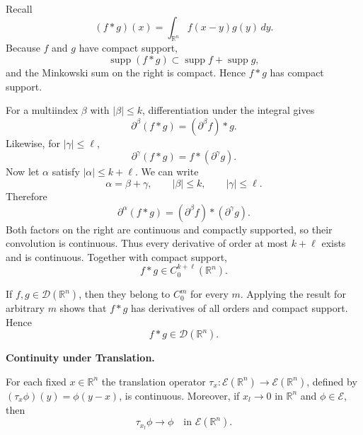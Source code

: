 \begin{solution}
Recall
\[
(f*g)(x)=\int_{\mathbb R^n}f(x-y)g(y)\,dy.
\]
Because \(f\) and \(g\) have compact support,
\[
\operatorname{supp}(f*g)
\subset
\operatorname{supp}f+\operatorname{supp}g,
\]
and the Minkowski sum on the right is compact. Hence \(f*g\) has compact support.

For a multiindex \(\beta\) with \(|\beta|\le k\), differentiation under the integral gives
\[
\partial^\beta(f*g)
=
(\partial^\beta f)*g.
\]
Likewise, for \(|\gamma|\le\ell\),
\[
\partial^\gamma(f*g)
=
f*(\partial^\gamma g).
\]
Now let \(\alpha\) satisfy \(|\alpha|\le k+\ell\). We can write
\[
\alpha=\beta+\gamma,
\qquad
|\beta|\le k,
\qquad
|\gamma|\le\ell.
\]
Therefore
\[
\partial^\alpha(f*g)
=
(\partial^\beta f)*(\partial^\gamma g).
\]
Both factors on the right are continuous and compactly supported, so their convolution
is continuous. Thus every derivative of order at most \(k+\ell\) exists and is
continuous. Together with compact support,
\[
\boxed{f*g\in C_0^{k+\ell}(\mathbb R^n).}
\]

If \(f,g\in\mathcal D(\mathbb R^n)\), then they belong to \(C_0^m\) for every
\(m\). Applying the result for arbitrary \(m\) shows that \(f*g\) has derivatives of
all orders and compact support. Hence
\[
\boxed{f*g\in\mathcal D(\mathbb R^n).}
\]
\end{solution}

\begin{problem}[CP-II-0067]
\label{prob:cp-ii-0067}
\textbf{Continuity under Translation.}

 \hspace*{1.5em}For each fixed $x\in\mathbb{R}^n$ the translation operator
		$\tau_x:\mathcal{E}(\mathbb{R}^n)\to\mathcal{E}(\mathbb{R}^n)$,
		defined by $(\tau_x\phi)(y)=\phi(y-x)$, is continuous.
		Moreover, if $x_l\to 0$ in $\mathbb{R}^n$ and $\phi\in\mathcal{E}$,
		then
		\[
		\tau_{x_l}\phi \longrightarrow \phi
		\quad\text{in }\mathcal{E}(\mathbb{R}^n).
		\]
\end{problem}

